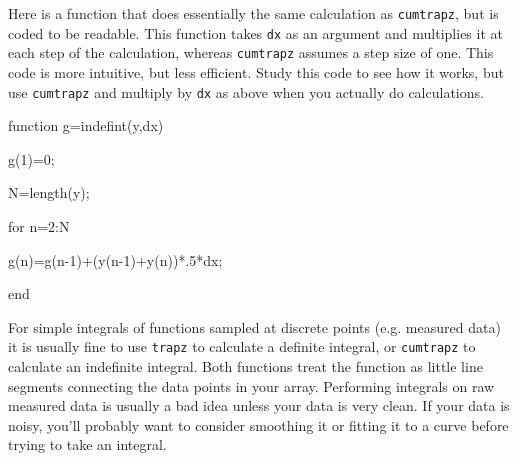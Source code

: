  
Here is a function that does essentially the same calculation as
\texttt{cumtrapz}, but is coded to be readable. This function takes
\texttt{dx} as an argument and multiplies it at each step of the calculation,
whereas \texttt{cumtrapz} assumes a step size of one. This code is more
intuitive, but less efficient. Study this code to see how it works, but use
\texttt{cumtrapz} and multiply by \texttt{dx} as above when you actually do
calculations.
\begin{codeexample}[indefint.py]
\begin{VerbatimOut}{\listingFile}
function g=indefint(y,dx)

%



g(1)=0;

N=length(y);


for n=2:N

   g(n)=g(n-1)+(y(n-1)+y(n))*.5*dx;

end
\end{VerbatimOut}
\end{codeexample}



  For simple integrals of functions sampled at discrete points
(e.g. measured data) it is usually fine to use {\tt trapz} to calculate a
definite integral, or {\tt cumtrapz} to calculate an indefinite integral.
Both functions treat the function as little line segments connecting the data
points in your array.  Performing integrals on raw measured data is usually a
bad idea unless your data is very clean. If your data is noisy, you'll
probably want to consider smoothing it or fitting it to a curve before trying
to take an integral.


